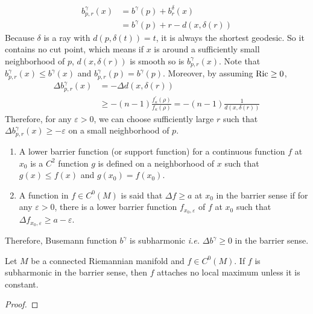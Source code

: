 \begin{enumerate}[label=\arabic{*}.]
\begin{equation*}
		\begin{aligned}
			b^\gamma_{p,r}(x) &= b^\gamma(p) + b^\delta_r(x) \\
			&= b^\gamma(p) + r - d(x,\delta(r))
		\end{aligned}
	\end{equation*}
	Because $\delta$ is a ray with $d(p,\delta(t)) = t$, it is always the shortest geodesic. So it contains no cut point, which means if $x$ is around a sufficiently small neighborhood of $p$, $d(x,\delta(r))$ is smooth so is $b^\gamma_{p,r}(x)$. Note that $b^\gamma_{p,r}(x) \leq b^\gamma(x)$ and $b^\gamma_{p,r}(p) = b^\gamma(p)$. Moreover, by assuming $\operatorname{Ric} \geq 0$,
	\begin{equation*}
		\begin{aligned}
			\Delta b^\gamma_{p,r}(x) &= - \Delta d(x,\delta(r))\\
			&\geq -(n-1)\frac{f^\prime_\kappa(\rho)}{f_\kappa(\rho)} =-(n-1)\frac{1}{d(x,\delta(r))}
		\end{aligned}
	\end{equation*}
	Therefore, for any $\varepsilon > 0$, we can choose sufficiently large $r$ such that $\Delta b^\gamma_{p,r}(x) \geq -\varepsilon$ on a small neighborhood of $p$.
	\begin{defn}
		\begin{enumerate}[label=(\arabic{*})]
			\item A lower barrier function (or support function) for a continuous function $f$ at $x_0$ is a $C^2$ function $g$ is defined on a neighborhood of $x$ such that $g(x) \leq f(x)$ and $g(x_0) = f(x_0)$.
			\item A function in $f \in C^0(M)$ is said that $\Delta f \geq a$ at $x_0$ in the barrier sense if for any $\varepsilon > 0$, there is a lower barrier function $f_{x_0,\varepsilon}$ of $f$ at $x_0$ such that $\Delta f_{x_0,\varepsilon} \geq a - \varepsilon$.
		\end{enumerate}
	\end{defn}
	\begin{rmk}
		Therefore, Busemann function $b^\gamma$ is subharmonic \emph{i.e.} $\Delta b^\gamma \geq 0$ in the barrier sense.
	\end{rmk}
	\begin{thm}
		Let $M$ be a connected Riemannian manifold and $f \in C^0(M)$. If $f$ is subharmonic in the barrier sense, then $f$ attaches no local maximum unless it is constant. 
	\end{thm}
	\begin{proof}

\end{proof}
\end{enumerate}
